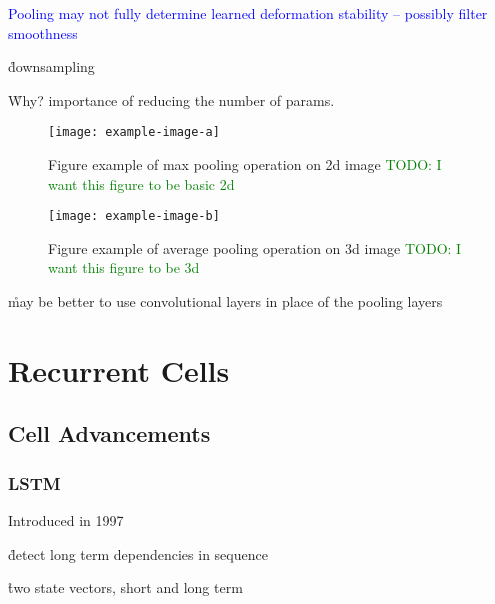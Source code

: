 
\textcolor{blue}{Pooling may not fully determine learned deformation stability -- possibly filter smoothness\cite{ruderman2018learned}}

\r{downsampling}

\r{Why? importance of reducing the number of params.}




\begin{figure}[htp]
	\centering
	\texttt{[image: example-image-a]}\hfil
	\caption{Figure example of max pooling operation on 2d image \textcolor{green}{TODO: I want this figure to be basic 2d}}
	\label{fig:pooling_max_2d_ex_a}
\end{figure}

\begin{figure}[htp]
	\centering
	\texttt{[image: example-image-b]}\hfil
	\caption{Figure example of average pooling operation on 3d image \textcolor{green}{TODO: I want this figure to be 3d}}
	\label{fig:pooling_avg_3d_ex_a}
\end{figure}


\r{may be better to use convolutional layers in place of the pooling layers\cite{springenberg2014striving}}

\section{Recurrent Cells}

\subsection{Cell Advancements}

\subsubsection{LSTM}


Introduced in 1997 %

\r{detect long term dependencies in sequence}

\r{two state vectors, short and long term}

